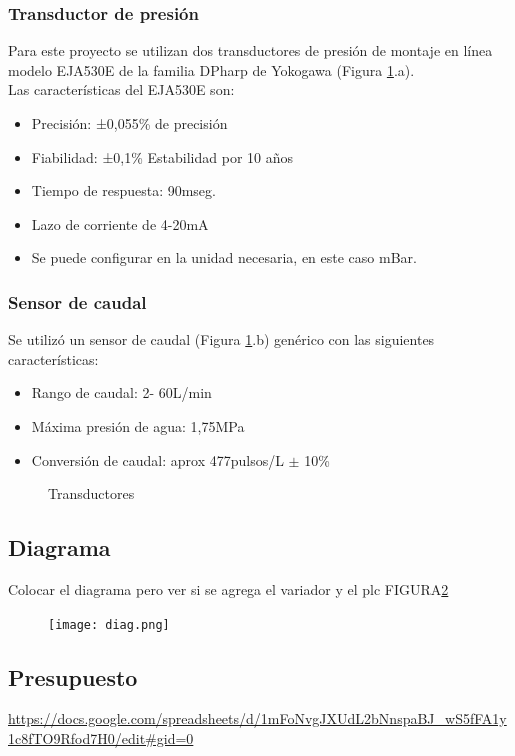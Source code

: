 \subsubsection{Transductor de presión}
Para este proyecto se utilizan dos transductores de presión de montaje en línea modelo EJA530E de la familia  DPharp de Yokogawa (Figura \ref{fig:transd}.a).\\
Las características del EJA530E son:
\begin{itemize}
	\item Precisión: ±0,055\% de precisión
	\item Fiabilidad: ±0,1\% Estabilidad por 10 años
	\item Tiempo de respuesta: 90mseg.
	\item Lazo de corriente de 4-20mA
	\item Se puede configurar en la unidad necesaria, en este caso mBar.
\end{itemize}


\subsubsection{Sensor de caudal}
Se utilizó un sensor de caudal (Figura \ref{fig:transd}.b) genérico con las siguientes características:
\begin{itemize}
	\item Rango de caudal: 2- 60L/min
	\item Máxima presión de agua: 1,75MPa
	\item Conversión de caudal: aprox 477pulsos/L $\pm$ 10\%
\end{itemize}


\begin{figure}[htbp]
	\centering
	\caption{Transductores} \label{fig:transd}
\end{figure}





\subsection{Diagrama}
Colocar el diagrama  pero ver si se agrega el variador y el plc FIGURA\ref{fig:diag}

\begin{figure}[htb]
	\centering
	\texttt{[image: diag.png]}
	\label{fig:diag}
\end{figure}

\subsection{Presupuesto}
\url{https://docs.google.com/spreadsheets/d/1mFoNvgJXUdL2bNnspaBJ_wS5fFA1y1c8fTO9Rfod7H0/edit#gid=0}

\newpage